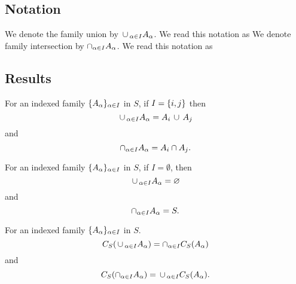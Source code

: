 \subsection{Notation}

We denote the family union by $\,\cup\,_{\alpha \in I} A_{\alpha}$.
We read this notation as 
We denote family intersection by $\cap_{\alpha \in I} A_{\alpha}$.
We read this notation as 

\subsection{Results}

\begin{prop}
  For an indexed family $\{A_{\alpha}\}_{\alpha \in I}$ in $S$, if $I = \{i, j\}$ then
  \[
    \,\cup\,_{\alpha \in I} A_{\alpha} = A_i \,\cup\, A_j
  \]
  and
  \[
    \cap_{\alpha \in I} A_{\alpha} = A_i \cap A_j.
  \]
\end{prop}

\begin{prop}
  For an indexed family $\{A_{\alpha}\}_{\alpha \in I}$ in $S$, if $I = \emptyset$, then
  \[
    \,\cup\,_{\alpha \in I} A_{\alpha} = \varnothing
  \]
  and
  \[
    \cap_{\alpha \in I} A_{\alpha} = S.
  \]
\end{prop}

\begin{prop}
  For an indexed family $\{A_{\alpha}\}_{\alpha \in I}$ in $S$.
  \[
    C_S(\,\cup\,_{\alpha \in I} A_{\alpha}) = \cap_{\alpha \in I} C_S(A_{\alpha})
  \]
  and
  \[
    C_S(\cap_{\alpha \in I} A_{\alpha}) = \,\cup\,_{\alpha \in I} C_S(A_{\alpha}).
  \]
\end{prop}


